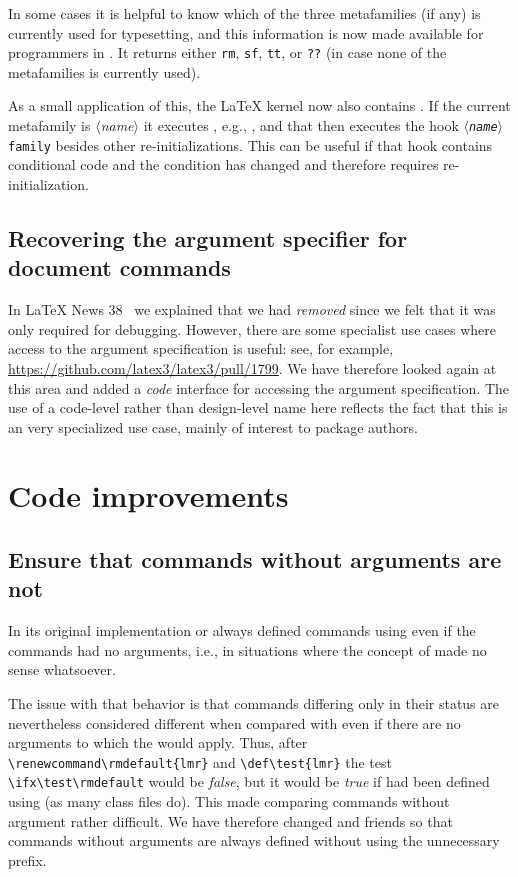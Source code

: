 \documentclass{ltnews}
\providecommand\meta[1]{$\langle$\textrm{\itshape#1}$\rangle$}
\begin{document}
In some cases it is helpful to know which of the three metafamilies
(if any) is currently used for typesetting, and this information is
now made available for programmers in . It
returns either \texttt{rm}, \texttt{sf}, \texttt{tt}, or \texttt{??} (in case
none of the metafamilies is currently used).

As a small application of this, the \LaTeX{} kernel now also contains
. If the current metafamily is
\meta{name} it executes \cs{\meta{name}family}, e.g., ,
and that then executes the hook \texttt{\meta{name}family} besides
other re-initializations. This can be useful if that hook contains
conditional code and the condition has changed and therefore requires
re-initialization.

\subsection{Recovering the argument specifier for document commands}

In \LaTeX{} News 38~\cite{42:ltnews38} we explained that we had \emph{removed}
 since we felt that it was only required for
debugging. However, there are some specialist use cases where access to the
argument specification is useful: see, for example,
\url{https://github.com/latex3/latex3/pull/1799}. We have therefore looked
again at this area and added a \emph{code} interface
 for accessing the argument specification. The
use of a code-level rather than design-level name here reflects the fact that
this is an very specialized use case, mainly of interest to package authors.

\section{Code improvements}

\subsection{Ensure that commands without arguments are not }

In its original implementation  or 
always defined commands using  even if the commands
had no arguments, i.e., in situations where the concept of 
made no sense whatsoever.

The issue with that behavior is that
commands differing only in their  status are nevertheless
considered different when compared with  even if there are no
arguments to which the  would apply. Thus, after
\verb=\renewcommand\rmdefault{lmr}= and \verb=\def\test{lmr}= the test
\verb=\ifx\test\rmdefault= would be \emph{false}, but it would be
\emph{true} if  had been defined using  (as many
class files do).  This made comparing commands without argument rather
difficult.
%
We have therefore changed  and friends so that
commands without arguments are always defined without using the
unnecessary  prefix.
\end{document}
